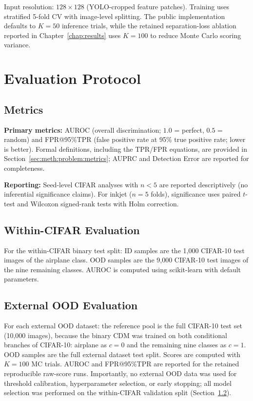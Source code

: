 Input resolution: $128 \times 128$ (YOLO-cropped feature patches).
Training uses stratified 5-fold CV with image-level splitting. The
public implementation defaults to $K=50$ inference trials, while the
retained separation-loss ablation reported in Chapter~\ref{chap:results}
uses $K=100$ to reduce Monte Carlo scoring variance.


\section{Evaluation Protocol}
\label{sec:exp:protocol}

\subsection{Metrics}
\label{sec:exp:protocol:metrics}

\textbf{Primary metrics:} AUROC (overall discrimination; $1.0$ = perfect,
$0.5$ = random) and FPR@95\%TPR (false positive rate at 95\% true positive
rate; lower is better). Formal definitions, including the TPR/FPR
equations, are provided in Section~\ref{sec:meth:problem:metrics};
AUPRC and Detection Error are reported for completeness.

\textbf{Reporting:} Seed-level CIFAR analyses with $n < 5$ are reported
descriptively (no inferential significance claims). For inkjet
($n = 5$ folds), significance uses paired $t$-test and Wilcoxon
signed-rank tests with Holm correction.

\subsection{Within-CIFAR Evaluation}
\label{sec:exp:protocol:within-cifar}

For the within-CIFAR binary test split: ID samples are the 1,000
CIFAR-10 test images of the airplane class. OOD samples are the 9,000
CIFAR-10 test images of the nine remaining classes. AUROC is computed
using scikit-learn with default parameters.

\subsection{External OOD Evaluation}
\label{sec:exp:protocol:external-ood}

For each external OOD dataset: the reference pool is the full CIFAR-10
test set (10,000 images), because the binary CDM was trained on both
conditional branches of CIFAR-10: airplane as $c{=}0$ and the
remaining nine classes as $c{=}1$. OOD samples are the full external
dataset test split. Scores are computed with $K = 100$ MC trials. AUROC and
FPR@95\%TPR are reported for the retained reproducible raw-score runs. Importantly, no
external OOD data was used for threshold calibration, hyperparameter
selection, or early stopping; all model selection was performed on the
within-CIFAR validation split (Section~\ref{sec:exp:protocol:within-cifar}).

